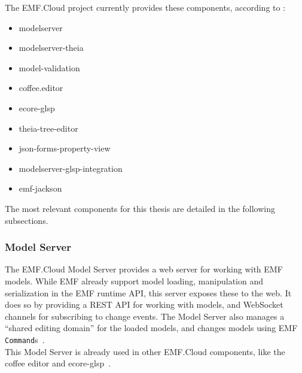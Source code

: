 The EMF.Cloud project currently provides these components, according to \cite{tobiasortmayrEclipseemfcloudEmfcloud2021}:

\begin{itemize}
  \item modelserver
  \item modelserver-theia
  \item model-validation
  \item coffee.editor
  \item ecore-glsp
  \item theia-tree-editor
  \item json-forms-property-view
  \item modelserver-glsp-integration
  \item emf-jackson
\end{itemize}

The most relevant components for this thesis are detailed in the following subsections.

\subsubsection{Model Server}
The EMF.Cloud Model Server provides a web server for working with \acrshort{EMF} models.
While \acrshort{EMF} already support model loading, manipulation and serialization in the \acrshort{EMF} runtime \acrshort{API}, this server exposes these to the web.
It does so by providing a \gls{REST} \acrshort{API} for working with models, and \gls{WebSocket} channels for subscribing to change events.
The Model Server also manages a ``shared editing domain'' for the loaded models, and changes models using \acrshort{EMF} \texttt{Command}s~\cite{foundationEMFCloud}.\\

This Model Server is already used in other EMF.Cloud components, like the coffee editor and ecore-glsp~\cite{eugenneufeldEclipseemfcloudCoffeeeditor2021,ninadoschekEclipseemfcloudEcoreglsp2021}.

